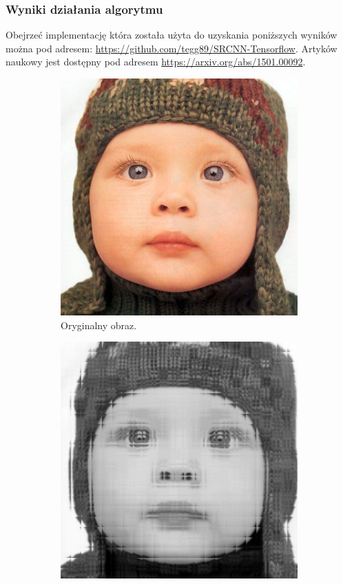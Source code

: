 \documentclass[a4paper,11pt, notitlepage ]{article}
\begin{document}
 \newpage
	 \subsubsection{Wyniki działania algorytmu}
	  Obejrzeć implementację która została użyta do uzyskania poniższych wyników można pod adresem:  \url{https://github.com/tegg89/SRCNN-Tensorflow}. Artyków naukowy jest dostępny pod adresem \url{https://arxiv.org/abs/1501.00092}. 
	 \begin{figure}[h!]
	 	\centering
	 	\begin{subfigure}[b]{0.4\linewidth}
	 		\includegraphics[width=\linewidth]{baby_GT.png}
	 		\caption{Oryginalny obraz.}
	 	\end{subfigure}
	 	\begin{subfigure}[b]{0.4\linewidth}
	 		\includegraphics[width=\linewidth]{SRCNN_test.png}

\end{subfigure}
\end{figure}
\end{document}

